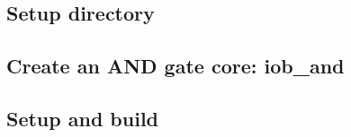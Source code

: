 \documentclass{ug}
\begin{document}
\subsection{Setup directory}
\label{sec:setup_dir}


\subsection{Create an AND gate core: iob\_and}
\label{sec:iob_and}


\subsection{Setup and build}
\label{sec:setup_build}


% 
% 
% 
% 
% 
% 
% 
% 
% 
% 
% 
% 
\end{document}
